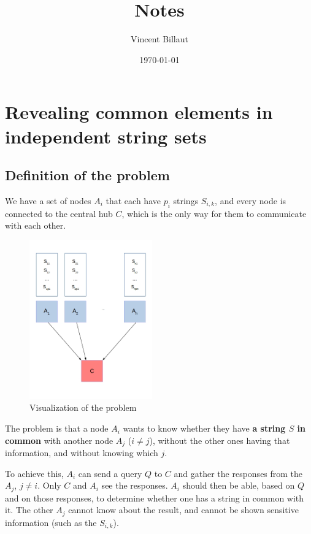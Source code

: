 \documentclass[usletter,11pt,final]{article}
\title{Notes}
\author{Vincent Billaut}
\date{\today}
\begin{document}
\begin{titlepage}
\maketitle
\tableofcontents
\end{titlepage}

\section{Revealing common elements in independent string sets}
\subsection{Definition of the problem}

We have a set of nodes $A_i$ that each have $p_i$ strings $S_{i,k}$, and every node is connected to the central hub $C$, which is the only way for them to communicate with each other.

\begin{figure}[h]
\begin{center}
\includegraphics[width=200px]{img/sketch1.jpg}
\caption{Visualization of the problem}
\end{center}
\end{figure}

The problem is that a node $A_i$ wants to know whether they have \textbf{a string $S$ in common} with another node $A_j$ ($i \ne j$), without the other ones having that information, and without knowing which $j$.

To achieve this, $A_i$ can send a query $Q$ to $C$ and gather the responses from the $A_j$, $j \ne i$. Only $C$ and $A_i$ see the responses. $A_i$ should then be able, based on $Q$ and on those responses, to determine whether one has a string in common with it. The other $A_j$ cannot know about the result, and cannot be shown sensitive information (such as the $S_{i,k}$).
\end{document}
